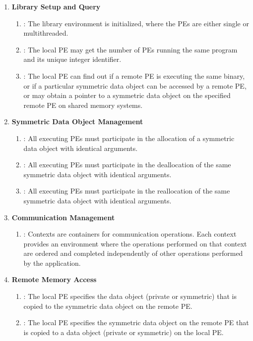 \begin{enumerate}

\item \textbf{Library Setup and Query}
\begin{enumerate}
  \item {}: The \openshmem library environment is initialized,
   where the \acp{PE} are either single or multithreaded. 
  \item {}: The local \ac{PE} may get the number of \acp{PE} running
      the same program and its unique integer identifier. 
  \item {}: The local \ac{PE} can find out if a remote \ac{PE} is
      executing the same binary, or if a particular symmetric data object can be
      accessed by a remote \ac{PE}, or may obtain a pointer to a symmetric data
      object on the specified remote \ac{PE} on shared memory systems.
\end{enumerate}

\item \textbf{Symmetric Data Object Management}
\begin{enumerate}
  \item {}: All executing \acp{PE} must participate in the
      allocation of a symmetric data object with identical arguments.
  \item  {}: All executing \acp{PE} must participate in the
      deallocation of the same symmetric data object with identical arguments.
  \item  {}: All executing \acp{PE} must participate in the
      reallocation of the same symmetric data object with identical arguments.
\end{enumerate}

\item \textbf{Communication Management}
\begin{enumerate}
    \item {}: Contexts are containers for communication operations.
        Each context provides an environment where the operations performed on
        that context are ordered and completed independently of other operations
        performed by the application.
\end{enumerate}

\item \textbf{Remote Memory Access}
\begin{enumerate}
    \item \PUT: The local \ac{PE} specifies the \source{} data object (private
        or symmetric) that is copied to the symmetric data object on the remote
        \ac{PE}. 
  \item \GET: The local \ac{PE} specifies the symmetric data object on the remote
      \ac{PE} that is copied to a data object (private or symmetric) on the local
      \ac{PE}. 
\end{enumerate}


\end{enumerate}
